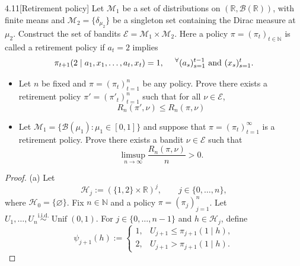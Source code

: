 \documentclass[10pt]{article}
\theoremstyle{definition}
\newenvironment{exercise*}[1]{%
  \IfBlankTF{#1}
    {\renewcommand{\themanualexerciseinner}{\unskip}}
    {\renewcommand\themanualexerciseinner{#1}}%
  \manualexerciseinner
}{\endmanualexerciseinner}
\begin{document}
\begin{exercise*}{4.11}[Retirement policy]
    Let $\mathcal{M}_1$ be a set of distributions on $(\mathbb{R}, \mathcal{B}(\mathbb{R}))$, with finite means and 
    $\mathcal{M}_2 = \{ \delta_{\mu_2} \}$ be a singleton set containing the Dirac measure at $\mu_2$.
    Construct the set of bandits $\mathcal{E} = \mathcal{M}_1 \times \mathcal{M}_2$. 
    Here a policy $\pi = (\pi_t)_{t \in \mathbb{N}}$ is called a retirement policy if $a_t = 2$ implies
    \begin{equation*}
        \pi_{t+1}(2 \mid a_1, x_1, \ldots, a_t, x_t) = 1, \hspace{1.3em} ^\forall (a_s)_{s=1}^{t-1} \text{ and } (x_s)_{s=1}^{t}.
    \end{equation*}
    \begin{itemize}
        \item[(a)] Let $n$ be fixed and $\pi = (\pi_t)_{t=1}^n$ be any policy.
        Prove there exists a retirement policy $\pi' = (\pi'_t)_{t=1}^n$ such that for all $\nu \in \mathcal{E}$,
        \begin{equation*}
            R_n(\pi', \nu) \leq R_n(\pi, \nu)
        \end{equation*}
        \item[(b)] Let $\mathcal{M}_1 = \{ \mathcal{B}(\mu_1):\mu_1 \in [0,1] \}$ and suppose that $\pi = (\pi_t)_{t=1}^\infty$ is a retirement policy.
        Prove there exists a bandit $\nu \in \mathcal{E}$ such that
        \begin{equation*}
            \limsup_{n \rightarrow \infty} \frac{R_n(\pi, \nu)}{n} > 0.
        \end{equation*}
    \end{itemize}
    \begin{proof}{(a)}
        Let 
        \begin{equation*}
            \mathcal H_j := (\{1,2\}\times\mathbb R)^j, \qquad j\in\{0,\ldots,n\},
        \end{equation*}
        where $\mathcal H_0=\{\varnothing\}$. 
        Fix $n\in\mathbb N$ and a policy $\pi=(\pi_j)_{j=1}^n$. 
        Let $U_1,\ldots,U_n \overset{\mathrm{i.i.d.}}{\sim} \operatorname{Unif}(0,1)$. 
        For $j\in\{0,\ldots,n-1\}$ and $h\in\mathcal H_j$, define 
        \begin{equation*}
            \psi_{j+1}(h):= 
            \begin{cases} 
                1, & U_{j+1}\leq \pi_{j+1}(1\mid h),\\ 
                2, & U_{j+1}>\pi_{j+1}(1\mid h). 

\end{cases}
\end{equation*}
\end{proof}
\end{exercise*}
\end{document}
